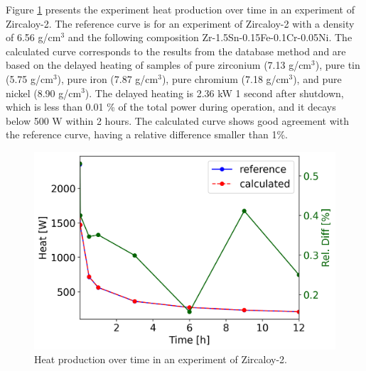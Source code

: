 Figure \ref{fig:atr-time-zirc} presents the experiment heat production over time in an experiment of Zircaloy-2.
The reference curve is for an experiment of Zircaloy-2 with a density of 6.56 g/cm$^3$ and the following composition Zr-1.5Sn-0.15Fe-0.1Cr-0.05Ni.
The calculated curve corresponds to the results from the database method and are based on the delayed heating of samples of pure zirconium (7.13 g/cm$^3$), pure tin (5.75 g/cm$^3$), pure iron (7.87 g/cm$^3$), pure chromium (7.18 g/cm$^3$), and pure nickel (8.90 g/cm$^3$).
The delayed heating is 2.36 kW 1 second after shutdown, which is less than 0.01 \% of the total power during operation, and it decays below 500 W within 2 hours.
The calculated curve shows good agreement with the reference curve, having a relative difference smaller than 1\%.

\begin{figure}[htbp!] %
    \centering
    \includegraphics[width=0.60\linewidth]{figures/zircaloy2-tot-vs-t}
    \hfill
    \caption{Heat production over time in an experiment of Zircaloy-2.}
    \label{fig:atr-time-zirc}
\end{figure}

